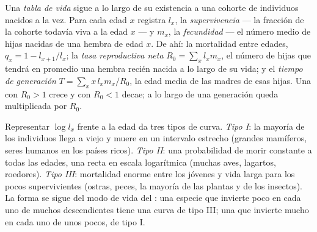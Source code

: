 \begin{definition}\label{def:b1:populations:lifetable}
Una \emph{tabla de vida} sigue a lo largo de su existencia a una cohorte de
individuos nacidos a la vez. Para cada edad $x$ registra $l_x$, la
\emph{supervivencia} --- la fracción de la cohorte todavía viva a la edad
$x$ --- y $m_x$, la \emph{fecundidad} --- el número medio de hijas nacidas
de una hembra de edad $x$. De ahí: la mortalidad entre edades,
$q_x = 1 - l_{x+1}/l_x$; la \emph{tasa reproductiva neta}
$R_0 = \sum_x l_x m_x$, el número de hijas que tendrá en promedio una hembra
recién nacida a lo largo de su vida; y el \emph{tiempo de generación}
$T = \sum_x x\,l_x m_x / R_0$, la edad media de las madres de esas hijas.
Una  con $R_0 > 1$ crece y con $R_0 < 1$ decae; a lo largo de una
generación queda multiplicada por $R_0$.
\end{definition}

\begin{proposition}\label{prop:b1:populations:survivorship}
Representar $\log l_x$ frente a la edad da tres tipos de curva. \emph{Tipo
I}: la mayoría de los individuos llega a viejo y muere en un intervalo
estrecho (grandes mamíferos, seres humanos en los países ricos). \emph{Tipo
II}: una probabilidad de morir constante a todas las edades, una recta en
escala logarítmica (muchas aves, lagartos, roedores). \emph{Tipo III}:
mortalidad enorme entre los jóvenes y vida larga para los pocos
supervivientes (ostras, peces, la mayoría de las plantas y de los insectos).
La forma se sigue del modo de vida del : una especie que invierte
poco en cada uno de muchos descendientes tiene una curva de tipo III; una
que invierte mucho en cada uno de unos pocos, de tipo I.
\end{proposition}

